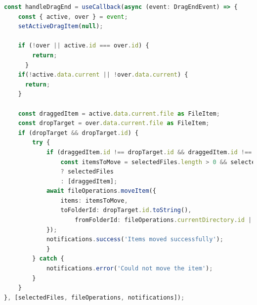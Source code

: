 \begin{lstlisting}[language=typescript, caption={Gestió del Drag \& Drop a `FileManager/index.tsx`}]
const handleDragEnd = useCallback(async (event: DragEndEvent) => {
    const { active, over } = event;
    setActiveDragItem(null);
    
    if (!over || active.id === over.id) {
        return;
      }
    if(!active.data.current || !over.data.current) {
      return;
    }
    
    const draggedItem = active.data.current.file as FileItem;
    const dropTarget = over.data.current.file as FileItem;
    if (dropTarget && dropTarget.id) {
        try {
            if (draggedItem.id !== dropTarget.id && draggedItem.id !== dropTarget.parent && dropTarget.type === 'folder') {
                const itemsToMove = selectedFiles.length > 0 && selectedFiles.some(f => f === draggedItem)
                ? selectedFiles
                : [draggedItem];
            await fileOperations.moveItem({
                items: itemsToMove, 
                toFolderId: dropTarget.id.toString(), 
                    fromFolderId: fileOperations.currentDirectory.id || 'root'
            });
            notifications.success('Items moved successfully');
            }
        } catch {
            notifications.error('Could not move the item');
        }
    }
}, [selectedFiles, fileOperations, notifications]);
\end{lstlisting}


